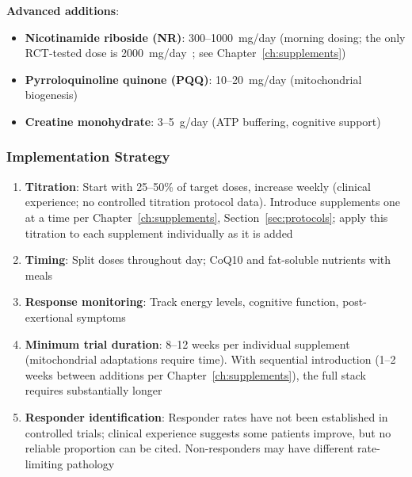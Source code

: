 \textbf{Advanced additions}:
\begin{itemize}
    \item \textbf{Nicotinamide riboside (NR)}: 300--1000~mg/day (morning dosing; the only RCT-tested dose is 2000~mg/day~\cite{Wu2025NRLongCOVID}; see Chapter~\ref{ch:supplements})
    \item \textbf{Pyrroloquinoline quinone (PQQ)}: 10--20~mg/day (mitochondrial biogenesis)
    \item \textbf{Creatine monohydrate}: 3--5~g/day (ATP buffering, cognitive support)
\end{itemize}

\subsubsection{Implementation Strategy}

\begin{enumerate}
    \item \textbf{Titration}: Start with 25--50\% of target doses, increase weekly (clinical experience; no controlled titration protocol data). Introduce supplements one at a time per Chapter~\ref{ch:supplements}, Section~\ref{sec:protocols}; apply this titration to each supplement individually as it is added
    \item \textbf{Timing}: Split doses throughout day; CoQ10 and fat-soluble nutrients with meals
    \item \textbf{Response monitoring}: Track energy levels, cognitive function, post-exertional symptoms
    \item \textbf{Minimum trial duration}: 8--12 weeks per individual supplement (mitochondrial adaptations require time). With sequential introduction (1--2 weeks between additions per Chapter~\ref{ch:supplements}), the full stack requires substantially longer
    \item \textbf{Responder identification}: Responder rates have not been established in controlled trials; clinical experience suggests some patients improve, but no reliable proportion can be cited. Non-responders may have different rate-limiting pathology
\end{enumerate}

